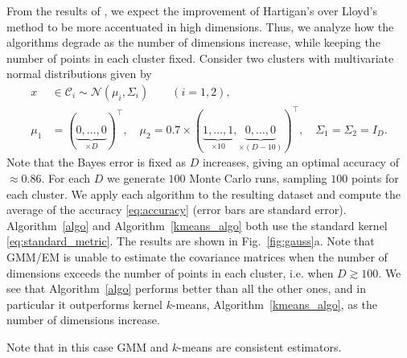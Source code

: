 \documentclass[aps,preprint,nofootinbib,floatfix]{revtex4-1}
\newcommand\C{{\mathcal{C}}}
\begin{document}
From the results of \cite{Telgarsky}, we expect the improvement of Hartigan's 
over Lloyd's method to be more accentuated in high dimensions.
Thus, we analyze
how the algorithms degrade as the number of dimensions increase, while
keeping the number of points in each cluster fixed. Consider
two clusters with multivariate normal distributions given by
\begin{equation}
\label{eq:gauss1}
\begin{split}
x &\in \C_i  \sim 
\mathcal{N}(\mu_i,\Sigma_i) \qquad (i=1,2),  \\
\mu_1 &= (\underbrace{0,\dotsc,0}_{\times D})^\top , \quad
\mu_2 = 0.7 \times (\underbrace{1,\dots,1}_{\times 10},
\underbrace{0,\dots,0}_{\times (D-10)})^\top, \quad
\Sigma_1 = \Sigma_2 = I_D.
\end{split}
\end{equation}
Note that the Bayes error
is fixed as $D$ increases, giving an optimal 
accuracy of $\approx 0.86$.
For each $D$ we generate $100$ Monte Carlo runs, 
sampling $100$ points for each cluster.
We apply each algorithm to the resulting dataset 
and compute the average of the accuracy \eqref{eq:accuracy} (error bars
are standard error).
Algorithm~\ref{algo} and Algorithm~\ref{kmeans_algo} 
both use the standard
kernel \eqref{eq:standard_metric}.
The results are shown in Fig.~\ref{fig:gauss}a.
Note that GMM/EM is unable to estimate the covariance matrices
when the number of dimensions exceeds the number of points in each cluster,
i.e. when $D \gtrsim 100$.
We see that Algorithm~\ref{algo} performs better than all the other ones,
and in particular it outperforms kernel $k$-means, Algorithm~\ref{kmeans_algo},
as the number
of dimensions increase. 

Note that in this case GMM and $k$-means are consistent estimators.
\end{document}
